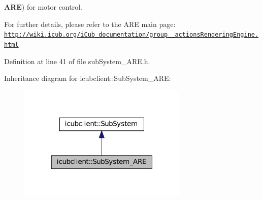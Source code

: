 {\bfseries A\+RE}) for motor control.

For further details, please refer to the A\+RE main page\+: \href{http://wiki.icub.org/iCub_documentation/group__actionsRenderingEngine.html}{\tt http\+://wiki.\+icub.\+org/i\+Cub\+\_\+documentation/group\+\_\+\+\_\+actions\+Rendering\+Engine.\+html} 

Definition at line 41 of file sub\+System\+\_\+\+A\+R\+E.\+h.



Inheritance diagram for icubclient\+:\+:Sub\+System\+\_\+\+A\+RE\+:
\nopagebreak
\begin{figure}[H]
\begin{center}
\leavevmode
\includegraphics[width=229pt]{classicubclient_1_1SubSystem__ARE__inherit__graph}
\end{center}
\end{figure}
